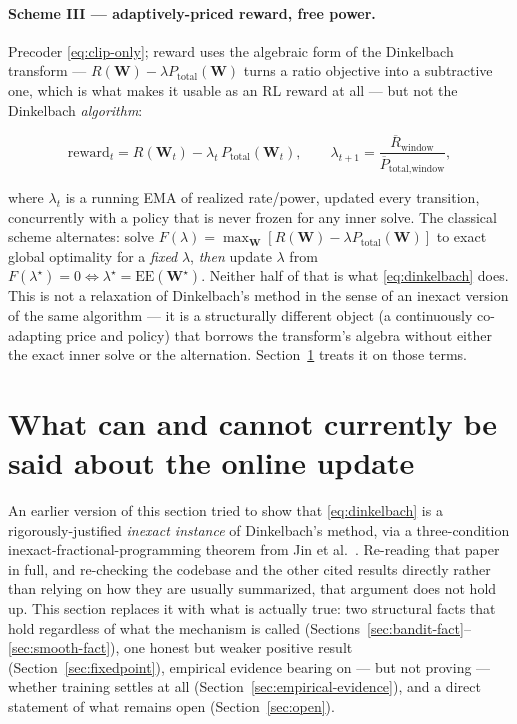 \documentclass[11pt]{article}
\begin{document}
\paragraph{Scheme III --- adaptively-priced reward, free power.}
Precoder \eqref{eq:clip-only}; reward uses the algebraic form of the
Dinkelbach transform \cite{Dinkelbach1967} --- $R(\mathbf{W})-\lambda
P_{\text{total}}(\mathbf{W})$ turns a ratio objective into a subtractive one,
which is what makes it usable as an RL reward at all --- but not the
Dinkelbach \emph{algorithm}:

\begin{equation}
  \mathrm{reward}_t = R(\mathbf{W}_t) - \lambda_t\, P_{\text{total}}(\mathbf{W}_t),
  \qquad
  \lambda_{t+1} = \frac{\overline{R}_{\text{window}}}{\overline{P}_{\text{total},\text{window}}},
  \label{eq:dinkelbach}
\end{equation}

where $\lambda_t$ is a running EMA of realized rate/power, updated every
transition, concurrently with a policy that is never frozen for any inner
solve. The classical scheme alternates: solve
$F(\lambda)=\max_{\mathbf{W}}[R(\mathbf{W})-\lambda P_{\text{total}}(\mathbf{W})]$
to exact global optimality for a \emph{fixed} $\lambda$, \emph{then} update
$\lambda$ from $F(\lambda^\star)=0 \iff \lambda^\star =
\mathrm{EE}(\mathbf{W}^\star)$. Neither half of that is what
\eqref{eq:dinkelbach} does. This is not a relaxation of Dinkelbach's method
in the sense of an inexact version of the same algorithm --- it is a
structurally different object (a continuously co-adapting price and policy)
that borrows the transform's algebra without either the exact inner solve or
the alternation. Section~\ref{sec:dinkelbach-rigor} treats it on those terms.

\section{What can and cannot currently be said about the online update}
\label{sec:dinkelbach-rigor}

An earlier version of this section tried to show that
\eqref{eq:dinkelbach} is a rigorously-justified \emph{inexact instance} of
Dinkelbach's method, via a three-condition inexact-fractional-programming
theorem from Jin et al.\ \cite{JinTangZhangWang2023}. Re-reading that paper
in full, and re-checking the codebase and the other cited results directly
rather than relying on how they are usually summarized, that argument does
not hold up. This section replaces it with what is actually true: two
structural facts that hold regardless of what the mechanism is called
(Sections~\ref{sec:bandit-fact}--\ref{sec:smooth-fact}), one honest but
weaker positive result (Section~\ref{sec:fixedpoint}), empirical evidence
bearing on --- but not proving --- whether training settles at all
(Section~\ref{sec:empirical-evidence}), and a direct statement of what
remains open (Section~\ref{sec:open}).
\end{document}
